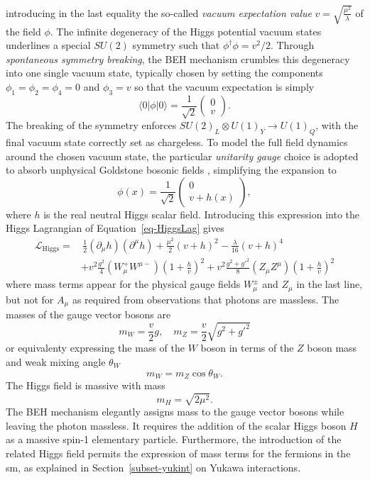 introducing in the last equality the so-called \textit{vacuum expectation value} $v = \sqrt{\frac{\mu^2}{\lambda}}$ of the field $\phi$. The infinite degeneracy of the Higgs potential vacuum states underlines a special $SU(2)$ symmetry such that $\phi^{\dagger} \phi = v^2/2$. Through \textit{spontaneous symmetry breaking}, the BEH mechanism crumbles this degeneracy into one single vacuum state, typically chosen by setting the components $\phi_1 = \phi_2 = \phi_4 = 0$ and $\phi_3 = v$ so that the vacuum expectation is simply
\begin{equation}
\langle 0|\phi|0 \rangle = \frac{1}{\sqrt{2}} \begin{pmatrix}
        0\\ 
        v
    \end{pmatrix}.
\end{equation}
The breaking of the symmetry enforces $SU(2)_L \otimes U(1)_Y \rightarrow U(1)_Q$, with the final vacuum state correctly set as chargeless. To model the full field dynamics around the chosen vacuum state, the particular \textit{unitarity gauge} \cite{PhysRevD.7.1068} choice is adopted to absorb unphysical Goldstone bosonic fields \cite{Goldstone:343400}, simplifying the expansion to
\begin{equation}
    \phi(x) = \frac{1}{\sqrt{2}} \begin{pmatrix}
            0\\ 
            v + h(x)
        \end{pmatrix},
\end{equation}
where $h$ is the real neutral Higgs scalar field. Introducing this expression into the Higgs Lagrangian of Equation~\ref{eq-HiggsLag} gives
\begin{equation}\label{eq-fullHiggs}
    \begin{split}
        \mathcal{L}_{\text{Higgs}} = & \,\frac{1}{2} (\partial_\mu h)(\partial^\mu h) + \frac{\mu^2}{2}(v+h)^2  - \frac{\lambda}{16}(v+h)^4 \\
        &+ v^2 \frac{g^2}{4} (W_{\mu}^+W^{\mu-})(1+\frac{h}{v})^2 + v^2 \frac{g^2 + {g'}^2}{8}(Z_{\mu}Z^{\mu})(1+\frac{h}{v})^2 
    \end{split}
\end{equation}
where mass terms appear for the physical gauge fields $W_{\mu}^{\pm}$ and $Z_\mu$ in the last line, but not for $A_{\mu}$ as required from observations that photons are massless. The masses of the gauge vector bosons are
\begin{equation}
    m_W = \frac{v}{2} g , \quad m_Z = \frac{v}{2}\sqrt{g^2 +g'^2} 
\end{equation}
or equivalenty expressing the mass of the $W$ boson in terms of the $Z$ boson mass and weak mixing angle $\theta_W$ \[m_W = m_Z \cos\theta_W.\] The Higgs field is massive with mass \[m_H = \sqrt{2\mu^2}.\] The BEH mechanism elegantly assigns mass to the gauge vector bosons while leaving the photon massless. It requires the addition of the scalar Higgs boson $H$ as a massive spin-1 elementary particle. Furthermore, the introduction of the related Higgs field permits the expression of mass terms for the fermions in the \gls{sm}, as explained in Section~\ref{subset-yukint} on Yukawa interactions. 

